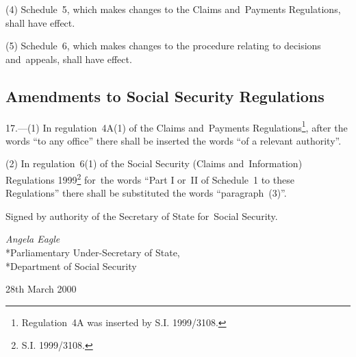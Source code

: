 \documentclass[12pt,a4paper]{article}
\begin{document}
(4) Schedule~5, which makes changes to the Claims and~Payments Regulations, shall have effect.

(5) Schedule~6, which makes changes to the procedure relating to decisions and~appeals, shall have effect.


\subsection[17. Amendments to Social Security Regulations]{Amendments to Social Security Regulations}

17.---(1)  In regulation~4A(1) of the Claims and~Payments Regulations\footnote{\frenchspacing Regulation~4A was inserted by S.I. 1999/3108.}, after the words “to any office” there shall be inserted the words “of a relevant authority”.

(2) In regulation~6(1) of the Social Security (Claims and~Information) Regulations 1999\footnote{\frenchspacing S.I. 1999/3108.} for~the words “Part I or~II of Schedule~1 to these Regulations” there shall be substituted the words “paragraph~(3)”. 

\bigskip

Signed 
by authority of the Secretary of State for~Social Security.

{\raggedleft
\emph{Angela Eagle
}\\*Parliamentary Under-Secretary of State,\\*Department of Social Security

}

28th March 2000

\small

\end{document}

